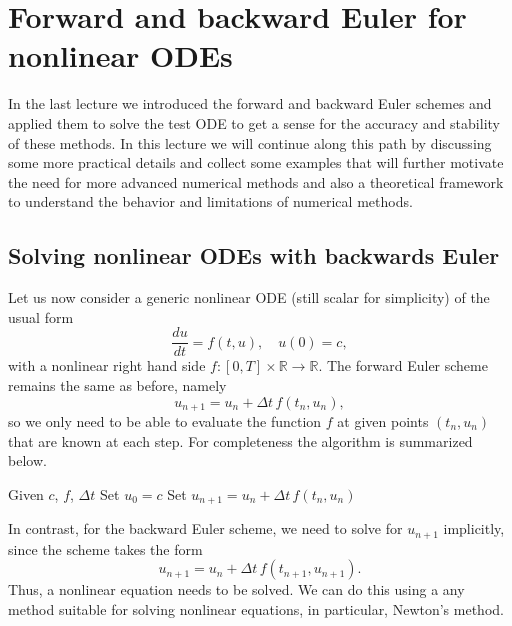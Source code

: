 \chapter{Forward and backward Euler for nonlinear ODEs}
\label{Lec:extension_nonlinear_odes}

In the last lecture we introduced the forward and backward Euler schemes 
and applied them to solve the test ODE to get a sense for the accuracy and stability of these methods. In this lecture we will continue along this path by discussing some 
more practical details and collect some examples that will further 
motivate the need for more advanced numerical methods and also a theoretical 
framework to understand the behavior and limitations of numerical methods.

\section{Solving nonlinear ODEs with backwards Euler}

Let us now consider a generic nonlinear ODE (still scalar for simplicity) of the 
usual form 
\begin{equation*}
    \frac{d u}{d t} = f(t,u), \quad u(0) = c,
\end{equation*}
with a nonlinear right hand side $f: [0,T] \times \mathbb{R} \to \mathbb{R}$.
The forward Euler scheme remains the same as before, namely
\begin{equation*}
    u_{n+1} = u_n + \Delta t \, f(t_n, u_n),
\end{equation*}
so we only need to be able to evaluate the function $f$ at given points
$(t_n, u_n)$ that are known at each step. For completeness 
the algorithm is summarized below. 

\begin{algorithm}
\caption{Forward Euler}\label{alg:forward_euler}
\begin{algorithmic}
\State Given $c$, $f$, $\Delta t$
\State Set $u_0 = c$
\State Set $u_{n+1} = u_n + \Delta t \, f(t_n, u_n)$
\EndFor
\end{algorithmic}
\end{algorithm}

In contrast, for the backward Euler scheme, we need to solve for 
$u_{n+1}$ implicitly, since the scheme takes the form 
\begin{equation*}
    u_{n+1} = u_n + \Delta t \, f(t_{n+1}, u_{n+1}).
\end{equation*}
Thus, a nonlinear equation needs to be solved. We can do this 
using a any method suitable for solving nonlinear equations, 
in particular, Newton's method. 


